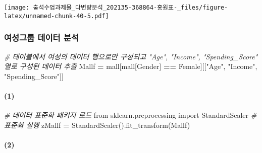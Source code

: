 \documentclass[
]{article}
\newenvironment{Shaded}{\begin{snugshade}}{\end{snugshade}}
\newcommand{\CommentTok}[1]{\textcolor[rgb]{0.56,0.35,0.01}{\textit{#1}}}
\newcommand{\ImportTok}[1]{#1}
\newcommand{\NormalTok}[1]{#1}
\newcommand{\OperatorTok}[1]{\textcolor[rgb]{0.81,0.36,0.00}{\textbf{#1}}}
\newcommand{\StringTok}[1]{\textcolor[rgb]{0.31,0.60,0.02}{#1}}
\begin{document}
\texttt{[image: 출석수업과제물\_다변량분석\_202135-368864-홍원표-\_files/figure-latex/unnamed-chunk-40-5.pdf]}

\hypertarget{uxc5ecuxc131uxadf8uxb8f9-uxb370uxc774uxd130-uxbd84uxc11d-1}{%
\subsubsection{여성그룹 데이터
분석}\label{uxc5ecuxc131uxadf8uxb8f9-uxb370uxc774uxd130-uxbd84uxc11d-1}}

\begin{Shaded}
\begin{Highlighting}[]
\CommentTok{\# 테이블에서 여성의 데이터 행으로만 구성되고 "Age", "Income", "Spending\_Score" 열로 구성된 데이터 추출}
\NormalTok{Mallf }\OperatorTok{=}\NormalTok{ mall[mall[}\StringTok{\textquotesingle{}Gender\textquotesingle{}}\NormalTok{] }\OperatorTok{==} \StringTok{\textquotesingle{}Female\textquotesingle{}}\NormalTok{][[}\StringTok{"Age"}\NormalTok{, }\StringTok{"Income"}\NormalTok{, }\StringTok{"Spending\_Score"}\NormalTok{]]}
\end{Highlighting}
\end{Shaded}

\hypertarget{section-20}{%
\paragraph{(1)}\label{section-20}}

\begin{Shaded}
\begin{Highlighting}[]
\CommentTok{\# 데이터 표준화 패키지 로드}
\ImportTok{from}\NormalTok{ sklearn.preprocessing }\ImportTok{import}\NormalTok{ StandardScaler}
\CommentTok{\# 표준화 실행}
\NormalTok{zMallf }\OperatorTok{=}\NormalTok{ StandardScaler().fit\_transform(Mallf)}
\end{Highlighting}
\end{Shaded}

\hypertarget{section-21}{%
\paragraph{(2)}\label{section-21}}
\end{document}
